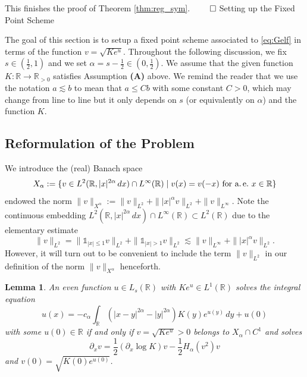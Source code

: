 \documentclass[reqno,10pt,a4paper]{amsart}
\makeatletter
\newtheorem{lem}{Lemma}[section]
\theoremstyle{definition}
\theoremstyle{definition}
\theoremstyle{remark}
\theoremstyle{remark}
\numberwithin{equation}{section}
\newcommand{\R}{\mathbb{R}}
\newcommand{\pt}{\partial}
\newcommand{\be}{\begin{equation}}
\newcommand{\ee}{\end{equation}}
\def\section{\@startsection{section}{1}%
  \z@{1.5\linespacing\@plus\linespacing}{.5\linespacing}%
  {\normalfont\bfseries\large\centering}}
\makeatother
\begin{document}
This finishes the proof of Theorem \ref{thm:reg_sym}. \hfill $\qed$
\section{Setting up the Fixed Point Scheme} \label{sec:setup}

The goal of this section is to setup a fixed point scheme associated to \eqref{eq:Gelf} in terms of the function $v = \sqrt{K e^u}$. Throughout the following discussion, we fix $s \in (\frac{1}{2},1)$ and we set $\alpha = s - \frac{1}{2} \in (0, \frac{1}{2})$. We assume that the given function $K: \R \to \R_{>0}$ satisfies Assumption \textbf{(A)} above. We remind the reader that we use the notation $a \lesssim b$ to mean that $a \leq C b$ with some constant $C>0$, which may change from line to line but it only depends on $s$ (or equivalently on $\alpha$) and the function $K$. 

\subsection{Reformulation of the Problem}

We introduce the (real) Banach space
\be
X_\alpha := \{ v \in L^2(\R, |x|^{2 \alpha} \, dx) \cap L^\infty(\R) \mid \mbox{$v(x) = v(-x)$ for a.\,e.~$x \in \R$} \}
\ee
endowed the norm $\| v \|_{X^\alpha} := \| v \|_{L^2} + \| |x|^{\alpha} v \|_{L^2} + \| v \|_{L^\infty}$. Note the continuous embedding $L^2(\R, |x|^{2 \alpha} \, dx) \cap L^\infty(\R) \subset L^2(\R)$ due to the elementary estimate
$$
\| v \|_{L^2} = \| \mathds{1}_{|x| \leq 1} v \|_{L^2} + \| \mathds{1}_{|x| > 1} v \|_{L^2} \lesssim \| v \|_{L^\infty} + \| |x|^{\alpha} v \|_{L^2}.
$$
However, it will turn out to be convenient to include the term $\| v \|_{L^2}$ in our definition of the norm $\| v \|_{X^\alpha}$ henceforth.


\begin{lem} \label{lem:reformulation}
An even function $u \in L_s(\R)$ with $K e^u \in L^1(\R)$ solves the integral equation
$$
u(x) = -c_\alpha \int_\R (|x-y|^{2 \alpha} - |y|^{2 \alpha}) K(y) e^{u(y)} \, dy + u(0)
$$
with some $u(0) \in \R$ if and only if $v = \sqrt{K e^u}>0$ belongs to $X_\alpha \cap C^1$ and solves
\be \label{eq:v}
\pt_x v = \frac{1}{2} (\pt_x \log K) v - \frac{1}{2} H_\alpha(v^2) v
\ee
and $v(0) = \sqrt{K(0) e^{u(0)}}$.
\end{lem}
\end{document}
